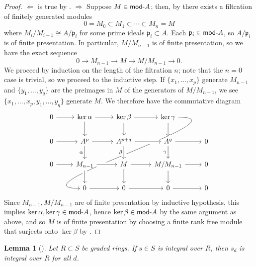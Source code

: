 \documentclass[10pt]{article}
\newtheorem{lemma}[subsubsection]{Lemma}
\theoremstyle{definition}
\theoremstyle{remark}
\numberwithin{equation}{section}
\numberwithin{figure}{subsubsection}
\newcommand{\Mod}{\mathsf{mod}\mathchar`-}
\begin{document}
\begin{proof}
  $\Leftarrow$ is true by \cite[Prop.~2.3]{AM69}. $\Rightarrow$ Suppose $M \in \Mod A$; then, by \cite[Thm.~7.6]{Rei95} there exists a filtration of finitely generated modules
  \begin{equation*}
    0 = M_0 \subset M_1 \subset \cdots \subset M_n = M
  \end{equation*}
  where $M_i/M_{i-1} \cong A/\mathfrak{p}_i$ for some prime ideals $\mathfrak{p}_i \subset A$. Each $\mathfrak{p}_i \in \Mod A$, so $A/\mathfrak{p}_i$ is of finite presentation. In particular, $M/M_{n-1}$ is of finite presentation, so we have the exact sequence
  \begin{equation*}
    0 \longrightarrow M_{n-1} \longrightarrow M \longrightarrow M/M_{n-1} \longrightarrow 0.
  \end{equation*}
  We proceed by induction on the length of the filtration $n$; note that the $n=0$ case is trivial, so we proceed to the inductive step. If $\{x_1,\ldots,x_p\}$ generate $M_{n-1}$ and $\{y_1,\ldots,y_q\}$ are the preimages in $M$ of the generators of $M/M_{n-1}$, we see $\{x_1,\ldots,x_p,y_1,\ldots,y_q\}$ generate $M$. We therefore have the commutative diagram
  \begin{equation*}
    \begin{tikzcd}
      0 \rar & \ker \alpha \rar\dar & \ker \beta \rar\dar & \ker \gamma\arrow[out=0, in=180, looseness=1.5]{dddll}\arrow[crossing over]{d}\\
      0 \rar & A^p \rar\dar[swap]{\alpha} & A^{p+q} \arrow[crossing over]{r}\arrow[crossing over]{d}[swap]{\beta} & A^q \rar\dar[swap]{\gamma} & 0\\
      0 \rar & M_{n-1} \arrow[crossing over]{r}\arrow[crossing over]{d} & M \rar\dar & M/M_{n-1} \rar\dar & 0\\
      & 0 \rar & 0 \rar & 0 \rar & 0
    \end{tikzcd}
  \end{equation*}
  Since $M_{n-1},M/M_{n-1}$ are of finite presentation by inductive hypothesis, this implies $\ker\alpha,\ker\gamma \in \Mod A$, hence $\ker\beta \in \Mod A$ by the same argument as above, and so $M$ is of finite presentation by choosing a finite rank free module that surjects onto $\ker\beta$ by \cite[Prop.~2.3]{AM69}.
\end{proof}
\begin{lemma}[{\cite[Thm.~2.3.2]{HS06}}]\label{gradedic}
  Let $R \subset S$ be graded rings. If $s \in S$ is integral over $R$, then $s_d$ is integral over $R$ for all $d$.
\end{lemma}
\end{document}
